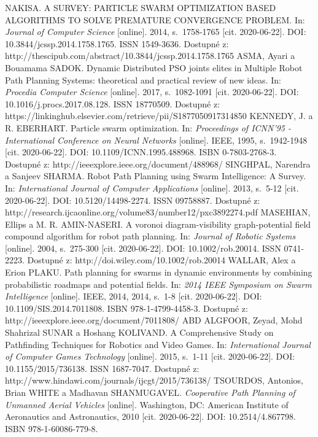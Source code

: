 \begin{thebibliography}{99}
NAKISA. A SURVEY: PARTICLE SWARM OPTIMIZATION BASED ALGORITHMS TO SOLVE PREMATURE CONVERGENCE PROBLEM. In: \textit{Journal of Computer Science} [online]. 2014, s.~1758-1765 [cit. 2020-06-22]. DOI: 10.3844/jcssp.2014.1758.1765. ISSN 1549-3636. Dostupné z: http://thescipub.com/abstract/10.3844/jcssp.2014.1758.1765
ASMA, Ayari a Bouamama SADOK. Dynamic Distributed PSO joints elites in Multiple Robot Path Planning Systems: theoretical and practical review of new ideas. In: \textit{Procedia Computer Science} [online]. 2017, s.~1082-1091 [cit. 2020-06-22]. DOI: 10.1016/j.procs.2017.08.128. ISSN 18770509. Dostupné z: https://linkinghub.elsevier.com/retrieve/pii/S1877050917314850
KENNEDY, J. a R. EBERHART. Particle swarm optimization. In: \textit{Proceedings of ICNN'95 - International Conference on Neural Networks} [online]. IEEE, 1995, s.~1942-1948 [cit. 2020-06-22]. DOI: 10.1109/ICNN.1995.488968. ISBN 0-7803-2768-3. Dostupné z: http://ieeexplore.ieee.org/document/488968/
SINGHPAL, Narendra a Sanjeev SHARMA. Robot Path Planning using Swarm Intelligence: A Survey. In: \textit{International Journal of Computer Applications} [online]. 2013, s.~5-12 [cit. 2020-06-22]. DOI: 10.5120/14498-2274. ISSN 09758887. Dostupné z: http://research.ijcaonline.org/volume83/number12/pxc3892274.pdf
MASEHIAN, Ellips a M. R. AMIN-NASERI. A voronoi diagram-visibility graph-potential field compound algorithm for robot path planning. In: \textit{Journal of Robotic Systems} [online]. 2004, s.~275-300 [cit. 2020-06-22]. DOI: 10.1002/rob.20014. ISSN 0741-2223. Dostupné z: http://doi.wiley.com/10.1002/rob.20014
WALLAR, Alex a Erion PLAKU. Path planning for swarms in dynamic environments by combining probabilistic roadmaps and potential fields. In: \textit{2014 IEEE Symposium on Swarm Intelligence} [online]. IEEE, 2014, 2014, s.~1-8 [cit. 2020-06-22]. DOI: 10.1109/SIS.2014.7011808. ISBN 978-1-4799-4458-3. Dostupné z: http://ieeexplore.ieee.org/document/7011808/
ABD ALGFOOR, Zeyad, Mohd Shahrizal SUNAR a Hoshang KOLIVAND. A Comprehensive Study on Pathfinding Techniques for Robotics and Video Games. In: \textit{International Journal of Computer Games Technology} [online]. 2015, s.~1-11 [cit. 2020-06-22]. DOI: 10.1155/2015/736138. ISSN 1687-7047. Dostupné z: http://www.hindawi.com/journals/ijcgt/2015/736138/
TSOURDOS, Antonios, Brian WHITE a Madhavan SHANMUGAVEL. \textit{Cooperative Path Planning of Unmanned Aerial Vehicles} [online]. Washington, DC: American Institute of Aeronautics and Astronautics, 2010 [cit. 2020-06-22]. DOI: 10.2514/4.867798. ISBN 978-1-60086-779-8.

\end{thebibliography}
